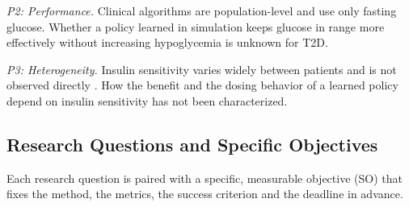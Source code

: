 \documentclass[conference]{IEEEtran}
\begin{document}
\emph{P2: Performance.} Clinical algorithms are population-level and use only fasting glucose.
Whether a policy learned in simulation keeps glucose in range more effectively without
increasing hypoglycemia is unknown for T2D.

\emph{P3: Heterogeneity.} Insulin sensitivity varies widely between patients and is not
observed directly \cite{karl2013}. How the benefit and the dosing behavior of a learned policy
depend on insulin sensitivity has not been characterized.

\subsection{Research Questions and Specific Objectives}
Each research question is paired with a specific, measurable objective (SO) that fixes the
method, the metrics, the success criterion and the deadline in advance.
\end{document}
